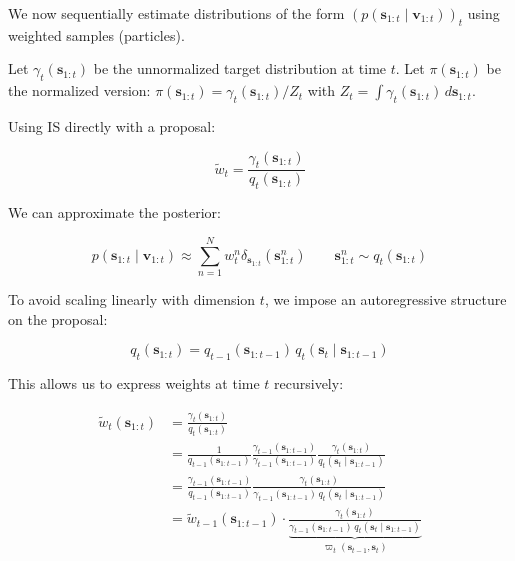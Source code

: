 \documentclass[11pt,a4paper]{article}
\begin{document}
We now sequentially estimate distributions of the form $(p(\mathbf{s}_{1:t} \mid \mathbf{v}_{1:t}))_t$ using weighted samples (particles).

Let $\gamma_t(\mathbf{s}_{1:t})$ be the unnormalized target distribution at time $t$. Let $\pi(\mathbf{s}_{1:t})$ be the normalized version: $\pi(\mathbf{s}_{1:t}) = \gamma_t(\mathbf{s}_{1:t})/Z_t$ with $Z_t = \int \gamma_t(\mathbf{s}_{1:t}) \, d\mathbf{s}_{1:t}$.

Using IS directly with a proposal:

\begin{equation}
\label{eq:sis_weights}
\tilde{w}_t = \frac{\gamma_t(\mathbf{s}_{1:t})}{q_t(\mathbf{s}_{1:t})}
\end{equation}

We can approximate the posterior:

\begin{equation}
p(\mathbf{s}_{1:t} \mid \mathbf{v}_{1:t}) \approx \sum_{n=1}^{N} w_t^n \delta_{\mathbf{s}_{1:t}}(\mathbf{s}_{1:t}^n) \qquad \mathbf{s}_{1:t}^n \sim q_t(\mathbf{s}_{1:t})
\end{equation}

To avoid scaling linearly with dimension $t$, we impose an autoregressive structure on the proposal:

\begin{equation}
q_t(\mathbf{s}_{1:t}) = q_{t-1}(\mathbf{s}_{1:t-1}) \, q_t(\mathbf{s}_t \mid \mathbf{s}_{1:t-1})
\end{equation}

This allows us to express weights at time $t$ recursively:

\begin{align}
\tilde{w}_t(\mathbf{s}_{1:t}) &= \frac{\gamma_t(\mathbf{s}_{1:t})}{q_t(\mathbf{s}_{1:t})} \nonumber \\
&= \frac{1}{q_{t-1}(\mathbf{s}_{1:t-1})} \frac{\gamma_{t-1}(\mathbf{s}_{1:t-1})}{\gamma_{t-1}(\mathbf{s}_{1:t-1})} \frac{\gamma_t(\mathbf{s}_{1:t})}{q_t(\mathbf{s}_t \mid \mathbf{s}_{1:t-1})} \nonumber \\
&= \frac{\gamma_{t-1}(\mathbf{s}_{1:t-1})}{q_{t-1}(\mathbf{s}_{1:t-1})} \frac{\gamma_t(\mathbf{s}_{1:t})}{\gamma_{t-1}(\mathbf{s}_{1:t-1}) \, q_t(\mathbf{s}_t \mid \mathbf{s}_{1:t-1})} \nonumber \\
&= \tilde{w}_{t-1}(\mathbf{s}_{1:t-1}) \cdot \underbrace{\frac{\gamma_t(\mathbf{s}_{1:t})}{\gamma_{t-1}(\mathbf{s}_{1:t-1}) \, q_t(\mathbf{s}_t \mid \mathbf{s}_{1:t-1})}}_{\varpi_t(\mathbf{s}_{t-1}, \mathbf{s}_t)}
\label{eq:sis_weight_update}
\end{align}
\end{document}
